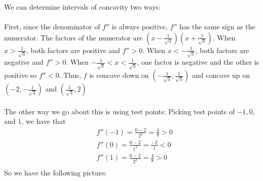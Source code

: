 \documentclass[nooutcomes,handout]{ximera}
\begin{document}
\begin{problem}
\begin{enumerate}
\begin{freeResponse}
		We can determine intervals of concavity two ways:\\\\
		First, since the denominator of $f''$ is always positive, $f''$ has the same sign as the numerator.  The factors of the numerator are $\left(x- \frac{1}{\sqrt{3}} \right) \left(x+ \frac{1}{\sqrt{3}} \right) $.  When $x>\frac{1}{\sqrt{3}}$, both factors are positive and $f''>0$.  When $x<-\frac{1}{\sqrt{3}}$, both factors are negative and $f''>0$.  When $-\frac{1}{\sqrt{3}}<x<\frac{1}{\sqrt{3}}$, one factor is negative and the other is positive so $f''<0$. Thus, $f$ is concave down on $\left( - \frac{1}{\sqrt{3}}, \frac{1}{\sqrt{3}} \right)$ and concave up on $\left( -2, - \frac{1}{\sqrt{3}} \right)$ and $ \left( \frac{1}{\sqrt{3}}, 2 \right)$\\\\
		
		The other way we go about this is using test points:
		Picking test points of $-1, 0, $ and $1$, we have that
		\begin{align*}
		& f''(-1) = \frac{6-2}{2^3} = \frac{4}{8} > 0 \\
		& f''(0) = \frac{0-2}{1^3} = \frac{-2}{1} < 0 \\
		& f''(1) = \frac{6-2}{2^3} = \frac{4}{8} > 0 \\
		\end{align*}
		So we have the following picture:
		
		
\begin{center}
\begin{image}
\end{image}
\end{center}
\end{freeResponse}
\end{enumerate}
\end{problem}
\end{document}
